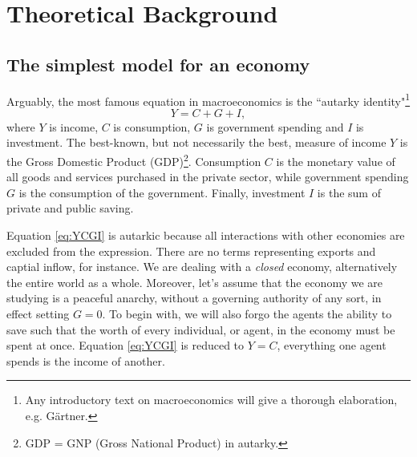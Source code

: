 \documentclass[10pt, a4paper]{amsart}
\begin{document}
\section{Theoretical Background}
\subsection{The simplest model for an economy}
Arguably, the most famous equation in macroeconomics is the ``autarky identity"\footnote{Any introductory text on macroeconomics will give a thorough elaboration, e.g. Gärtner.}
\begin{equation}
\label{eq:YCGI}
Y = C + G + I,
\end{equation}
where $Y$ is income, $C$ is consumption, $G$ is government spending and $I$ is investment. The best-known, but not necessarily the best, measure of income $Y$ is the Gross Domestic Product (GDP)\footnote{GDP = GNP (Gross National Product) in autarky.}. Consumption $C$ is the monetary value of all goods and services purchased in the private sector, while government spending $G$ is the consumption of the government. Finally, investment $I$ is the sum of private and public saving. 

Equation \ref{eq:YCGI} is autarkic because all interactions with other economies are excluded from the expression. There are no terms representing exports and captial inflow, for instance. We are dealing with a \emph{closed} economy, alternatively the entire world as a whole. Moreover, let's assume that the economy we are studying is a peaceful anarchy, without a governing authority of any sort, in effect setting $G = 0$. To begin with, we will also forgo the agents the ability to save such that the worth of every individual, or agent, in the economy must be spent at once. Equation \ref{eq:YCGI} is reduced to $Y = C$, everything one agent spends is the income of another.
\end{document}
